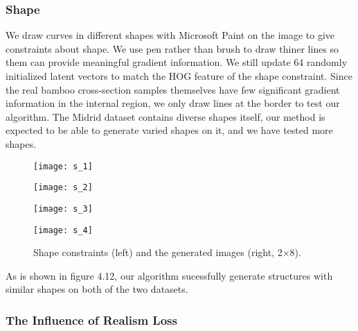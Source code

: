 \subsubsection{Shape}

We draw curves in different shapes with Microsoft Paint on the image to give constraints about shape. We use pen rather than brush to draw thiner lines so them can provide meaningful gradient information. We still update 64 randomly initialized latent vectors to match the HOG feature of the shape constraint. Since the real bamboo cross-section samples themselves have few significant gradient information in the internal region, we only draw lines at the border to test our algorithm. The Midrid dataset contains diverse shapes itself, our method is expected to be able to generate varied shapes on it, and we have tested more shapes. 

\begin{figure}
	\centering

		\begin{minipage}[b]{0.8\textwidth}
			\texttt{[image: s\_1]}\\
		\end{minipage}

		\begin{minipage}[b]{0.8\textwidth}
			\texttt{[image: s\_2]}\\
		\end{minipage}

		\begin{minipage}[b]{0.8\textwidth}
			\texttt{[image: s\_3]}\\
		\end{minipage}

	\begin{minipage}[b]{0.8\textwidth}
		\texttt{[image: s\_4]}
	\end{minipage}

	\caption{Shape constraints (left) and the generated images (right, 2$\times$8).} \label{fig:20}
\end{figure}

As is shown in figure 4.12, our algorithm sucessfully generate structures with similar shapes on both of the two datasets. 

\subsubsection{The Influence of Realism Loss}

